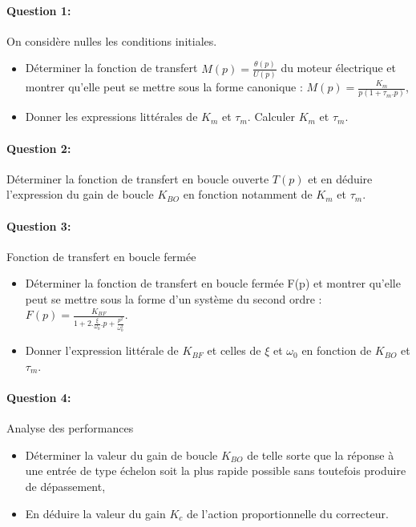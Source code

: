 \paragraph{Question 1:} On considère nulles les conditions initiales.

\begin{itemize}
 \item Déterminer la fonction de transfert $M(p)=\frac{\theta(p)}{U(p)}$ du moteur électrique et montrer qu'elle peut se mettre sous la forme canonique : $M(p)=\frac{K_m}{p(1+\tau_m.p)}$,
 \item Donner les expressions littérales de $K_m$ et $\tau_m$. Calculer $K_m$ et $\tau_m$.
\end{itemize}

\paragraph{Question 2:} Déterminer la fonction de transfert en boucle ouverte $T(p)$ et en déduire l'expression du gain de boucle $K_{BO}$ en fonction notamment de $K_m$ et $\tau_m$.

\paragraph{Question 3:} Fonction de transfert en boucle fermée

\begin{itemize}
 \item Déterminer la fonction de transfert en boucle fermée F(p) et montrer qu'elle peut se mettre sous la forme d'un système du second ordre : $F(p)=\frac{K_{BF}}{1+2.\frac{\xi}{\omega_0}.p+\frac{p^2}{\omega_0^2}}$.
 \item Donner l'expression littérale de $K_{BF}$ et celles de $\xi$ et $\omega_0$ en fonction de $K_{BO}$ et $\tau_m$.
\end{itemize}

\paragraph{Question 4:} Analyse des performances

\begin{itemize}
 \item Déterminer la valeur du gain de boucle $K_{BO}$ de telle sorte que la réponse à une entrée de type échelon soit la plus rapide possible sans toutefois produire de dépassement,
 \item En déduire la valeur du gain $K_c$ de l'action proportionnelle du correcteur.
\end{itemize}

